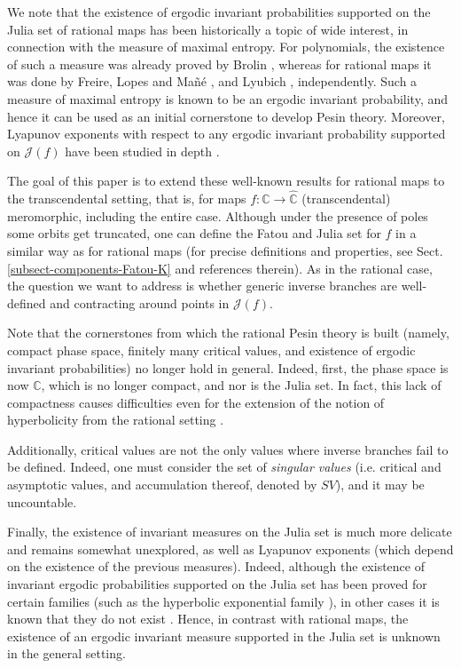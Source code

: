 \documentclass[11pt]{article}
\theoremstyle{definition}
\theoremstyle{remark}
\newcounter{main}
\theoremstyle{plain}
\begin{document}
We note that the existence of ergodic invariant probabilities supported on the Julia set of rational maps has been historically a topic of wide interest, in connection with the measure of maximal entropy. For polynomials, the existence of such a measure  was already proved by  Brolin \cite{Brolin65},  whereas for rational maps it was done by Freire, Lopes and Mañé \cite{Freire-Lopes-Mane}, and  Lyubich  \cite{Ljubich_1983}, independently. Such a measure of maximal entropy is known to be an ergodic invariant probability, and hence it can be used as an initial cornerstone to develop Pesin theory. Moreover, Lyapunov exponents with respect to any  ergodic invariant probability supported on $ \mathcal{J}(f) $  have been studied in depth \cite{Przytycki-Hausdorff_dimension,Przytycki-Lyapunovexponents, DobbsP}.





The goal of this paper is to extend these well-known results for rational maps to the transcendental setting, that is, for maps $ f\colon\mathbb{C}\to\widehat{\mathbb{C}} $ (transcendental) meromorphic, including the entire case. Although under the presence of poles some orbits get truncated, one can define the Fatou and Julia set for $ f $ in a similar way as for rational maps (for precise definitions and properties, see Sect. \ref{subsect-components-Fatou-K} and references therein). As in the rational case, the question we want to address is whether generic inverse branches are well-defined and contracting around points in $ \mathcal{J}(f) $.

Note that the cornerstones from which the rational Pesin theory is built (namely, compact phase space, finitely many critical values, and existence of ergodic invariant probabilities) no longer hold in general. Indeed, first, the phase space is now $ \mathbb{C} $, which is no longer compact, and nor is the Julia set. In fact, this lack of compactness causes difficulties even for the extension of the notion of hyperbolicity from the rational setting  \cite{Rempe-Sixsmith}.

Additionally, critical values are not the only values where inverse branches fail to be defined. Indeed, one must consider the set of {\em singular values} (i.e. critical and asymptotic values, and accumulation thereof, denoted by $ SV$),  and it may be uncountable.

Finally, the existence of invariant measures on the Julia set is much more delicate and remains somewhat unexplored, as well as  Lyapunov exponents (which depend on the existence of the previous measures).
{Indeed, although the existence of invariant ergodic probabilities supported on the Julia set has been proved for certain families (such as the hyperbolic exponential family \cite{UrbanskiZdunik}), in other cases it is known that they do not exist \cite{Dobbs}. Hence, in contrast with  rational maps, the existence of an ergodic invariant measure supported in the Julia set is unknown in the general setting. }
\end{document}
